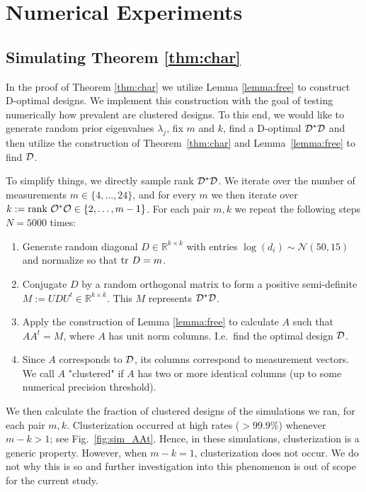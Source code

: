 \section{Numerical Experiments}


\subsection{Simulating Theorem \ref{thm:char}}\label{subsec:lemma_sims}
In the proof of Theorem \ref{thm:char} we utilize Lemma
\ref{lemma:free} to construct D-optimal designs. We implement this
construction with the goal of testing numerically how prevalent are
clustered designs. To this end, we would like to generate random prior
eigenvalues $\lambda_j$, fix $m$ and $k$, find a D-optimal
$\mathcal{D}^*\mathcal{D}$ and then utilize the construction of
Theorem~\ref{thm:char} and Lemma~\ref{lemma:free} to find $\mathcal{D}$.


To simplify things, we directly sample rank $\mathcal{D}^*\mathcal{D}$. We iterate
over the number of measurements $m \in \{4,\dots, 24\}$, and for every
$m$ we then iterate over $k:=\textup{rank}\  \mathcal{O}^*\mathcal{O} \in \{2,\dots,
m-1\}$. For each pair $m,k$ we repeat the following steps $N=5000$
times:
\begin{enumerate}
\item Generate random diagonal $D\in \mathbb{R}^{k\times k}$ with
  entries $\log (d_i) \sim \mathcal{N}(50,15)$ and normalize so that
  $\textup{tr}\ D = m$. 
\item Conjugate $D$ by a random orthogonal matrix to form a positive
  semi-definite $M := UDU^t \in \mathbb{R}^{k\times k}$. This $M$
  represents $\mathcal{D}^*\mathcal{D}$.
\item Apply the construction of Lemma \ref{lemma:free} to calculate
  $A$ such that $AA^t = M$, where $A$ has unit norm columns. I.e.~find
  the optimal design $\mathcal{D}$.
\item Since $A$ corresponds to $\mathcal{D}$, its columns correspond to
  measurement vectors. We call $A$ "clustered" if $A$ has two or more
  identical columns (up to some numerical precision threshold).
\end{enumerate}
We then calculate the fraction of clustered designs of the simulations
we ran, for each pair $m,k$. Clusterization occurred at high rates
($>99.9\%$) whenever $m-k > 1$; see Fig.~\ref{fig:sim_AAt}. Hence, in
these simulations, clusterization is a generic property. However, when
$m-k = 1$, clusterization does not occur. We do not why this is so and
further investigation into this phenomenon is out of scope for the
current study.

